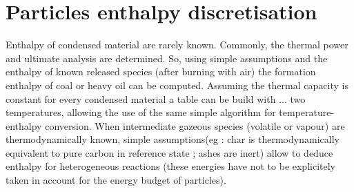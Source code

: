 \section{Particles enthalpy discretisation}

Enthalpy of condensed material are rarely known. Commonly, the thermal power and ultimate analysis are determined. So, using simple assumptions and the enthalpy of known released species ({\small after burning with air}) the formation enthalpy of coal or heavy oil can be computed. Assuming the thermal capacity is constant for every condensed material a table can be build with ... two temperatures, allowing the use of the same simple algorithm for temperature-enthalpy conversion. When intermediate gazeous species ({\small volatile or vapour}) are thermodynamically known, simple assumptions({\small eg : char is thermodynamically equivalent to pure carbon in reference state ; ashes are inert}) allow to deduce enthalpy for heterogeneous reactions ({\small these energies have not to be explicitely taken in account for the energy budget of particles}).
